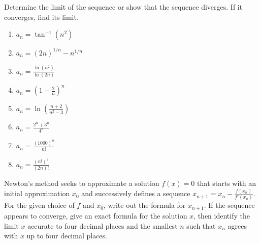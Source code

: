 \documentclass{exercises}
\begin{document}
Determine the limit of the sequence or show that the sequence diverges. If it converges, find its limit.

\begin{enumerate}[resume]
\item $a_{n}=\tan^{-1}(n^{2})$
\item $a_{n}={(2n)}^{1/n}-n^{1/n}$
\item $a_{n}=\frac{\ln(n^{2})}{\ln(2n)}$
\item $a_{n}={(1-\frac{2}{n})}^{n}$
\item $a_{n}=\ln(\frac{n+2}{n^{2}-3})$
\item $a_{n}=\frac{2^{n}+3^{n}}{4^{n}}$
\item $a_{n}=\frac{{(1000)}^{n}}{n!}$
\item $a_{n}=\frac{{(n!)}^{2}}{(2n)!}$
\end{enumerate}

Newton's method seeks to approximate a solution $f(x)=0$ that starts with an initial approximation $x_{0}$ and successively defines a sequence $x_{n+1}=x_{n}-\frac{f(x_{n})}{f'(x_{n})}$. For the given choice of $f$ and $x_{0}$, write out the formula for $x_{n+1}$. If the sequence appears to converge, give an exact formula for the solution $x$, then identify the limit $x$ accurate to four decimal places and the smallest $n$ such that $x_{n}$ agrees with $x$ up to four decimal places.
\end{document}
